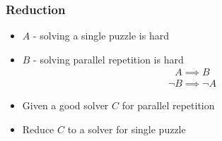 \documentclass[first,firstsupp,last]{ETHclass}
\begin{document}
\begin{frame}[t]
\frametitle{Reduction}
\begin{itemize}
  \item $A$ - solving a single puzzle is hard
  \item $B$ - solving parallel repetition is hard
    \begin{align*}
      A \implies B
    \end{align*}
      \begin{align*}
        \lnot B \implies \lnot A
      \end{align*}
  \item Given a good solver $C$ for parallel repetition
  \item Reduce $C$ to a solver for single puzzle
\end{itemize}
\end{frame}

\end{document}
